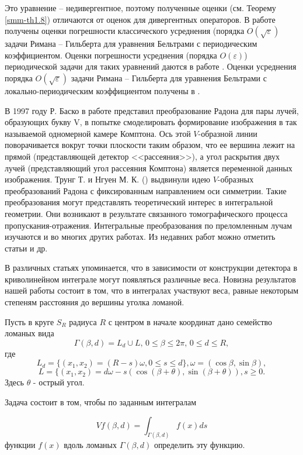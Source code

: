 Это уравнение -- недивергентное, поэтому полученные оценки (см. Теорему \ref{smm-th1.8}) отличаются от оценок для дивергентных операторов.
В работе \cite{smm-8} получены оценки погрешности классического усреднения (порядка  $O(\sqrt\varepsilon)$ задачи Римана -- Гильберта  для уравнения Бельтрами с периодическим коэффициентом. Оценки погрешности усреднения (порядка $O(\varepsilon)$) периодической задачи для таких уравнений даются в работе \cite{smm-9}.  Оценки усреднения  порядка $O(\sqrt\varepsilon)$  задачи Римана -- Гильберта для уравнения Бельтрами с локально-периодическим коэффициентом получены  в \cite{smm-10}.


В 1997 году Р. Баско в работе \cite{mzg-Basko} представил преобразование Радона для пары лучей, образующих букву V, в попытке смоделировать формирование изображения в так называемой одномерной камере Комптона. Ось этой $V$-образной линии поворачивается вокруг точки плоскости таким образом, что ее вершина лежит на прямой (представляющей детектор <<рассеяния>>), а угол раскрытия двух лучей (представляющий угол рассеяния Комптона) является переменной данных изображения.
Трунг Т. и Нгуен М. К. (\cite{mzg-Truong}) выдвинули идею $V$-образных преобразований Радона с фиксированным направлением оси симметрии. Такие преобразования могут представлять теоретический интерес в интегральной геометрии. Они возникают в результате связанного томографического процесса пропускания-отражения. Интегральные преобразования по преломленным лучам изучаются и во многих других работах. Из недавних работ можно отметить статьи \cite{mzg-Ambartsoumian2,mzg-Kuchment} и др.

В различных статьях упоминается, что в зависимости от конструкции детектора в криволинейном интеграле могут появляться различные веса. Новизна результатов нашей работы состоит в том, что в интегралах участвуют веса, равные некоторым степеням расстояния до вершины уголка ломаной.

Пусть в круге $S_R$ радиуса $R$ с центром в начале координат дано семейство ломаных вида
$$\Gamma(\beta,d)=L_d\cup L, \, 0\leq\beta\leq 2\pi, \, 0\leq d\leq R,$$
где
$$L_d=\{(x_1, x_2)=(R-s)\omega,  0\leq s\leq d\}, \omega=(\cos\beta, \sin \beta),$$
$$L=\{(x_1, x_2)=d\omega-s(\cos (\beta+\theta), \sin (\beta+\theta)), s\geq 0.$$
Здесь $\theta$ - острый угол.

Задача состоит в том, чтобы по заданным интегралам

\begin{equation}
\label{mzg-eq-one3}
Vf(\beta,d)=\int_{\Gamma(\beta,d)}f(x)ds
\end{equation}
функции $f(x)$ вдоль ломаных $\Gamma(\beta,d)$ определить эту функцию.

